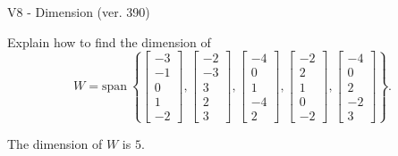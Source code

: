 \begin{exercise}
  \begin{exerciseTitle}V8 - Dimension (ver. 390)\end{exerciseTitle}
  \begin{exerciseStatement}
    Explain how to find the dimension of 
\[W=\mathrm{span}\ \left\{\left[\begin{array}{r}
-3 \\
-1 \\
0 \\
1 \\
-2
\end{array}\right] , \left[\begin{array}{r}
-2 \\
-3 \\
3 \\
2 \\
3
\end{array}\right] , \left[\begin{array}{r}
-4 \\
0 \\
1 \\
-4 \\
2
\end{array}\right] , \left[\begin{array}{r}
-2 \\
2 \\
1 \\
0 \\
-2
\end{array}\right] , \left[\begin{array}{r}
-4 \\
0 \\
2 \\
-2 \\
3
\end{array}\right]\right\}.\]



  \end{exerciseStatement}
  \begin{exerciseAnswer}
   The dimension of \(W\) is  \(5\).
  


  \end{exerciseAnswer}
\end{exercise}